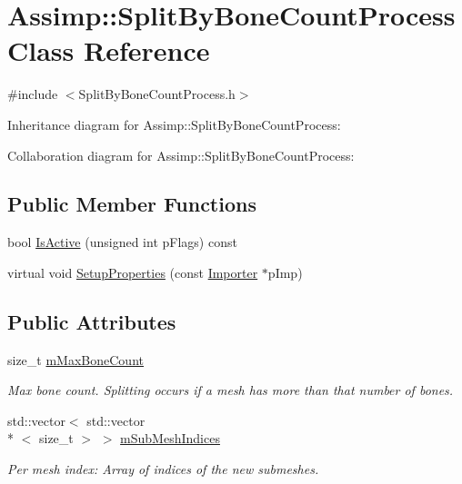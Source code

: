 \hypertarget{class_assimp_1_1_split_by_bone_count_process}{\section{Assimp\+:\+:Split\+By\+Bone\+Count\+Process Class Reference}
\label{class_assimp_1_1_split_by_bone_count_process}
}


{\ttfamily \#include $<$Split\+By\+Bone\+Count\+Process.\+h$>$}



Inheritance diagram for Assimp\+:\+:Split\+By\+Bone\+Count\+Process\+:


Collaboration diagram for Assimp\+:\+:Split\+By\+Bone\+Count\+Process\+:
\subsection*{Public Member Functions}
\begin{DoxyCompactItemize}
\item 
bool \hyperlink{class_assimp_1_1_split_by_bone_count_process_a2b2395f9eb88c2539114241e5a53331c}{Is\+Active} (unsigned int p\+Flags) const 
\item 
virtual void \hyperlink{class_assimp_1_1_split_by_bone_count_process_a1d3d5d3cd647a19eeb2828f38fb5f12d}{Setup\+Properties} (const \hyperlink{class_assimp_1_1_importer}{Importer} $\ast$p\+Imp)
\end{DoxyCompactItemize}
\subsection*{Public Attributes}
\begin{DoxyCompactItemize}
\item 
\hypertarget{class_assimp_1_1_split_by_bone_count_process_affeda4401f3a32769c986d8eb6946e2f}{size\+\_\+t \hyperlink{class_assimp_1_1_split_by_bone_count_process_affeda4401f3a32769c986d8eb6946e2f}{m\+Max\+Bone\+Count}}\label{class_assimp_1_1_split_by_bone_count_process_affeda4401f3a32769c986d8eb6946e2f}

\begin{DoxyCompactList}\small\item\em Max bone count. Splitting occurs if a mesh has more than that number of bones. \end{DoxyCompactList}\item 
\hypertarget{class_assimp_1_1_split_by_bone_count_process_a74c35395c15f4b81ee534518cfb3de17}{std\+::vector$<$ std\+::vector\\*
$<$ size\+\_\+t $>$ $>$ \hyperlink{class_assimp_1_1_split_by_bone_count_process_a74c35395c15f4b81ee534518cfb3de17}{m\+Sub\+Mesh\+Indices}}\label{class_assimp_1_1_split_by_bone_count_process_a74c35395c15f4b81ee534518cfb3de17}

\begin{DoxyCompactList}\small\item\em Per mesh index\+: Array of indices of the new submeshes. \end{DoxyCompactList}\end{DoxyCompactItemize}
